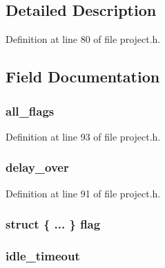 \subsection{\-Detailed \-Description}


\-Definition at line 80 of file project.\-h.



\subsection{\-Field \-Documentation}
\hypertarget{unions__system__flags_abf876e68df8575f02084e137cc49266b}{
\subsubsection[{all\-\_\-flags}]{ {\bf all\-\_\-flags}}}\label{unions__system__flags_abf876e68df8575f02084e137cc49266b}


\-Definition at line 93 of file project.\-h.

\hypertarget{unions__system__flags_ad5b983b8993f0c84c55acdf27ba1b970}{
\subsubsection[{delay\-\_\-over}]{ {\bf delay\-\_\-over}}}\label{unions__system__flags_ad5b983b8993f0c84c55acdf27ba1b970}


\-Definition at line 91 of file project.\-h.

\hypertarget{unions__system__flags_af304308f8c7e41fd32adb2085357b6ae}{
\subsubsection[{flag}]{\setlength{\rightskip}{0pt plus 5cm}struct \{ ... \}   {\bf flag}}}\label{unions__system__flags_af304308f8c7e41fd32adb2085357b6ae}
\hypertarget{unions__system__flags_a819736792984a6a50bc4ffb12a07b985}{
\subsubsection[{idle\-\_\-timeout}]{ {\bf idle\-\_\-timeout}}}\label{unions__system__flags_a819736792984a6a50bc4ffb12a07b985}


